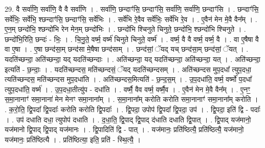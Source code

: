 \documentclass[17pt]{extarticle}
\begin{document}
29. वै सर्वा॑णि॒ सर्वा॑णि॒ वै वै सर्वा॑णि । . सर्वा॑णि॒ छन्दाꣳ॑सि॒ छन्दाꣳ॑सि॒ सर्वा॑णि॒ सर्वा॑णि॒ छन्दाꣳ॑सि । . छन्दाꣳ॑सि॒ सर्वे॑भिः॒ सर्वे॑भि॒ श्छन्दाꣳ॑सि॒ छन्दाꣳ॑सि॒ सर्वे॑भिः । . सर्वे॑भि रे॒वैव सर्वे॑भिः॒ सर्वे॑भि रे॒व । . ए॒वैन॑ मेन मे॒वै वैन᳚म् । . ए॒न॒म् छन्दो॑भि॒ श्छन्दो॑भि रेन मेन॒म् छन्दो॑भिः । . छन्दो॑भि श्चिनुते चिनुते॒ छन्दो॑भि॒ श्छन्दो॑भि श्चिनुते । . छन्दो॑भि॒रिति॒ छन्दः॑ - भिः॒ । . चि॒नु॒ते॒ वर्ष्म॒ वर्ष्म॑ चिनुते चिनुते॒ वर्ष्म॑ । . वर्ष्म॒ वै वै वर्ष्म॒ वर्ष्म॒ वै । . वा ए॒षैषा वै वा ए॒षा । . ए॒षा छन्द॑सा॒म् छन्द॑सा मे॒षैषा छन्द॑साम् । . छन्द॑सां॒ ॅयद् यच् छन्द॑सा॒म् छन्द॑सां॒ ॅयत् । . यदति॑च्छन्दा॒ अति॑च्छन्दा॒ यद् यदति॑च्छन्दाः । . अति॑च्छन्दा॒ यद् यदति॑च्छन्दा॒ अति॑च्छन्दा॒ यत् । . अति॑च्छन्दा॒ इत्यति॑ - छ॒न्दाः॒ । . यदति॑च्छन्दस॒ मति॑च्छन्दसं॒ ॅयद् यदति॑च्छन्दसम् । . अति॑च्छन्दस मुप॒दधा᳚ त्युप॒दधा॒ त्यति॑च्छन्दस॒ मति॑च्छन्दस मुप॒दधा॑ति । . अति॑च्छन्दस॒मित्यति॑ - छ॒न्द॒स॒म् । . उ॒प॒दधा॑ति॒ वर्ष्म॒ वर्ष्मो॑ प॒दधा᳚ त्युप॒दधा॑ति॒ वर्ष्म॑ । . उ॒प॒दधा॒तीत्यु॑प - दधा॑ति । . वर्ष्मै॒ वैव वर्ष्म॒ वर्ष्मै॒व । . ए॒वैन॑ मेन मे॒वै वैन᳚म् । . ए॒नꣳ॒॒ स॒मा॒नानाꣳ॑ समा॒नाना॑ मेन मेनꣳ समा॒नाना᳚म् । . स॒मा॒नाना᳚म् करोति करोति समा॒नानाꣳ॑ समा॒नाना᳚म् करोति । . क॒रो॒ति॒ द्वि॒पदा᳚ द्वि॒पदाः᳚ करोति करोति द्वि॒पदाः᳚ । . द्वि॒पदा॒ उपोप॑ द्वि॒पदा᳚ द्वि॒पदा॒ उप॑ । . द्वि॒पदा॒ इति॑ द्वि - पदाः᳚ । . उप॑ दधाति दधा॒ त्युपोप॑ दधाति । . द॒धा॒ति॒ द्वि॒पाद् द्वि॒पाद् द॑धाति दधाति द्वि॒पात् । . द्वि॒पाद् यज॑मानो॒ यज॑मानो द्वि॒पाद् द्वि॒पाद् यज॑मानः । . द्वि॒पादिति॑ द्वि - पात् । . यज॑मानः॒ प्रति॑ष्ठित्यै॒ प्रति॑ष्ठित्यै॒ यज॑मानो॒ यज॑मानः॒ प्रति॑ष्ठित्यै । . प्रति॑ष्ठित्या॒ इति॒ प्रति॑ - स्थि॒त्यै॒ । \newline
\end{document}
